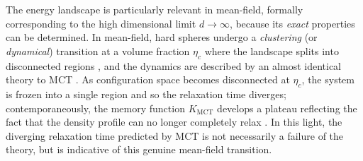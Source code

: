 \documentclass[11pt,twoside]{report}
\begin{document}
The energy landscape is particularly relevant in mean-field, formally corresponding to the high dimensional limit%
$d \to \infty$, because its \emph{exact} properties can be determined.
In mean-field, hard spheres undergo a \emph{clustering} (or \emph{dynamical}) transition at a volume fraction $\eta_c$ where the landscape splits into disconnected regions \cite{ParisiRMP2010,KurchanJSM2012,KurchanJSM2016}, and the dynamics are described by an almost identical theory to MCT \cite{MaimbourgPRL2016,KurchanJSM2016}.
As configuration space becomes disconnected at $\eta_c$, the system is frozen into a single region and so the relaxation time diverges; contemporaneously, the memory function $K_\mathrm{MCT}$ develops a plateau reflecting the fact that the density profile can no longer completely relax \cite{CharbonneauARCMP2017}.
In this light, the diverging relaxation time predicted by MCT is not necessarily a failure of the theory, but is indicative of this genuine mean-field transition.
\end{document}
